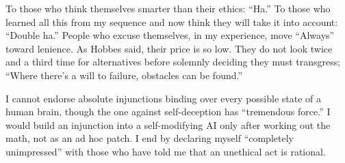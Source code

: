 To those who think themselves smarter than their ethics: ``Ha.'' To those who learned all this from my sequence and now think they will take it into account: ``Double ha.'' People who excuse themselves, in my experience, move ``Always'' toward lenience.  As Hobbes said, their price is so low. They do not look twice and a third time for alternatives before solemnly deciding they must transgress; ``Where there's a will to failure, obstacles can be found.'' 

I cannot endorse absolute injunctions binding over every possible state of a human brain, though the one against self-deception has ``tremendous force.'' I would build an injunction into a self-modifying AI only after working out the math, not as an ad hoc patch. I end by declaring myself ``completely unimpressed'' with those who have told me that an unethical act is rational.
